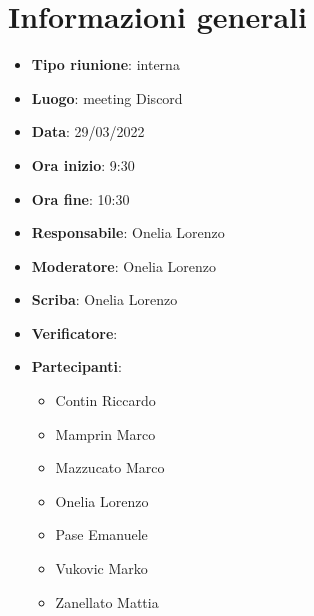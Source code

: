 \section{Informazioni generali}
\begin{itemize}
  \item \textbf{Tipo riunione}: interna
  \item \textbf{Luogo}: meeting Discord
  \item \textbf{Data}: 29/03/2022
  \item \textbf{Ora inizio}: 9:30
  \item \textbf{Ora fine}: 10:30
  \item \textbf{Responsabile}: Onelia Lorenzo
  \item \textbf{Moderatore}: Onelia Lorenzo
  \item \textbf{Scriba}: Onelia Lorenzo 
  \item \textbf{Verificatore}:
  \item \textbf{Partecipanti}:
  \begin{itemize}
    \item Contin Riccardo
    \item Mamprin Marco
    \item Mazzucato Marco
    \item Onelia Lorenzo
    \item Pase Emanuele
    \item Vukovic Marko
    \item Zanellato Mattia
  \end{itemize}
\end{itemize}
